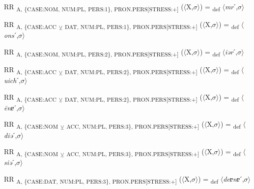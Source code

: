 {\begin{exe}
 RR \textsubscript{A, \{CASE:NOM, NUM:PL, PERS:1\}, PRON.PERS[STRESS:+]} ($\langle$X,$\sigma $$\rangle$) = \textsubscript{def} $\langle$\textit{mr}ˊ,$\sigma $$\rangle$
\end{exe}

\begin{exe}
 RR \textsubscript{A, \{CASE:ACC} \textsubscript{${\veebar}$}\textsubscript{ DAT, NUM:PL, PERS:1\}, PRON.PERS[STRESS:+]} ($\langle$X,$\sigma $$\rangle$) = \textsubscript{def} $\langle$\textit{ons}ˊ,$\sigma $$\rangle$
\end{exe}

\begin{exe}
 RR \textsubscript{A, \{CASE:NOM, NUM:PL, PERS:2\}, PRON.PERS[STRESS:+]} ($\langle$X,$\sigma $$\rangle$) = \textsubscript{def} $\langle$\textit{iər}ˊ,$\sigma $$\rangle$
\end{exe}

\begin{exe}
 RR \textsubscript{A, \{CASE:ACC} \textsubscript{${\veebar}$}\textsubscript{ DAT, NUM:PL, PERS:2\}, PRON.PERS[STRESS:+]} ($\langle$X,$\sigma $$\rangle$) = \textsubscript{def} $\langle$\textit{uich}ˊ,$\sigma $$\rangle$
\end{exe}

\begin{exe}
 RR \textsubscript{A, \{CASE:ACC} \textsubscript{${\veebar}$}\textsubscript{ DAT, NUM:PL, PERS:2\}, PRON.PERS[STRESS:+]} ($\langle$X,$\sigma $$\rangle$) = \textsubscript{def} $\langle$\textit{\=enɐ}ˊ,$\sigma $$\rangle$
\end{exe}

\begin{exe}
 RR \textsubscript{A, \{CASE:NOM} \textsubscript{${\veebar}$}\textsubscript{ ACC, NUM:PL, PERS:3\}, PRON.PERS[STRESS:+]} ($\langle$X,$\sigma $$\rangle$) = \textsubscript{def} $\langle$\textit{diə}ˊ,$\sigma $$\rangle$
\end{exe}

\begin{exe}
 RR \textsubscript{A, \{CASE:NOM} \textsubscript{${\veebar}$}\textsubscript{ ACC, NUM:PL, PERS:3\}, PRON.PERS[STRESS:+]} ($\langle$X,$\sigma $$\rangle$) = \textsubscript{def} $\langle$\textit{siə}ˊ,$\sigma $$\rangle$
\end{exe}

\begin{exe}
 RR \textsubscript{A, \{CASE:DAT, NUM:PL, PERS:3\}, PRON.PERS[STRESS:+]} ($\langle$X,$\sigma $$\rangle$) = \textsubscript{def} $\langle$\textit{deɐnɐ}ˊ,$\sigma $$\rangle$
\end{exe}

}
